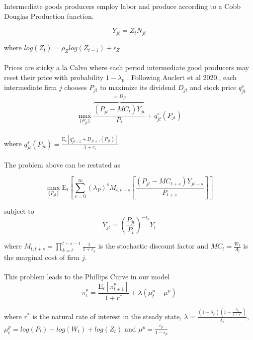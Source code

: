 \documentclass[titlepage]{\econtex}\providecommand{\texname}{BufferStockTheory}
\begin{document}
Intermediate goods producers  employ labor and produce according to a Cobb Douglas Production function.  

$$Y_{jt} =  Z_{t}  N_{jt}$$ 

where $log(Z_{t}) = \rho_{Z} log( Z_{t-1}) + \epsilon_{Z}$ \\ \\


Prices are sticky a la Calvo where each period intermediate good producers may reset their price with probability $ 1 -\lambda_{p}$ . Following Auclert et al 2020., each intermediate firm $j$ chooses $P_{jt}$ to maximize its dividend $D_{jt}$ and  stock price $q^{s}_{jt} $ \\ 
 
 $$\max_{\{P_{jt}\}} \overbrace{\frac{(P_{jt} - MC_{t})Y_{jt}}{P_{t}}}^{=D_{jt}} + q^{s}_{jt}\left(P_{jt}\right) $$ \\
 
where  $q^{s}_{jt}\left(P_{jt}\right) = \frac{\mathrm{E}_{t}\left[q^{s}_{jt+1} +D_{jt+1}\left(P_{jt}\right)\right]}{1+r_{t}}$ \\ \\

The problem above can be restated as 
 
 $$\max_{\{P_{jt}\}} \mathrm{E}_{t}\left[\sum_{s=0}^{\infty} (\lambda_{P}) ^{s} M_{t,t+s} \left[ \frac{(P_{jt} - MC_{t+s})Y_{jt+s}}{P_{t+s}}\right]\right]$$
 
subject to $$Y_{jt} = \left(\frac {P_{jt}}{P_{t}}\right)^{- \epsilon_{p}} Y_{t}$$
 
where $M_{t, t+s} = \prod_{k=t}^{t+s-1} \frac{1}{1+r_{k}}$ is the stochastic discount factor and $MC_{t} = \frac{W_{t}}{A_{t}}$ is the marginal cost of firm $j$.  \\ \\


This problem leads to the Phillips Curve in our model \\ 

$$ \pi_{t}^{p} = \frac{\mathrm{E}_{t}[\pi_{t+1}^{p}]}{1+r^{*}} + \lambda (\mu_{t}^{p} -\mu^{p})$$

where $r^{*}$ is the natural rate of interest in the steady state, $\lambda = \frac{(1-\lambda_{p})(1-\frac{\lambda_{p}}{1+r^{*}})}{\lambda_{p}}$,  $ \mu_{t}^{p} = log(P_{t}) - log(W_{t}) + log(Z_{t})$ and $\mu^{p} = \frac{\epsilon_{p}}{1-\epsilon_{p}}$ \\ \\
\end{document}
